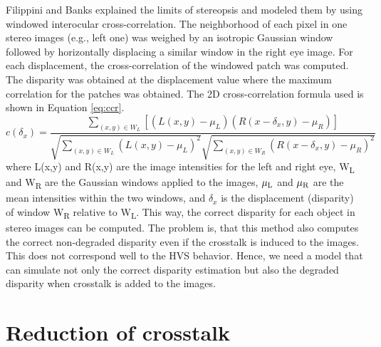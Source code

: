 Filippini and Banks\cite{filippini2009limits} explained the limits of stereopsis and modeled them by using windowed interocular cross-correlation. The neighborhood of each pixel in one stereo images (e.g., left one) was weighed by an isotropic Gaussian window followed by horizontally displacing a similar window in the right eye image. For each displacement, the cross-correlation of the windowed patch was computed. The disparity was obtained at the displacement value where the maximum correlation for the patches was obtained. The 2D cross-correlation formula used is shown in Equation \ref{eq:ccr}.
\begin{equation}
c(\delta_x) = \frac{ \sum\limits_{(x,y) \in W_L} [(L(x,y) - \mu_L)(R(x-\delta_x, y) - \mu_R)] }{\sqrt{\sum\limits_{(x,y) \in W_L}(L(x,y) - \mu_L)^2} \sqrt{\sum\limits_{(x,y) \in W_R}(R(x-\delta_x, y)- \mu_R)^2}}
\label{eq:ccr}
\end{equation}
where L(x,y) and R(x,y) are the image intensities for the left and right eye, W\textsubscript{L} and W\textsubscript{R} are the Gaussian windows applied to the images, $\mu\textsubscript{L}$ and $\mu\textsubscript{R}$ are the mean intensities within the two windows, and $\delta_x$ is the displacement (disparity) of window W\textsubscript{R} relative to W\textsubscript{L}. This way, the correct disparity for each object in stereo images can be computed. The problem is, that this method also computes the correct non-degraded disparity even if the crosstalk is induced to the images. This does not correspond well to the HVS behavior. Hence, we need a model that can simulate not only the correct disparity estimation but also the degraded disparity when crosstalk is added to the images.

\section{Reduction of crosstalk}

